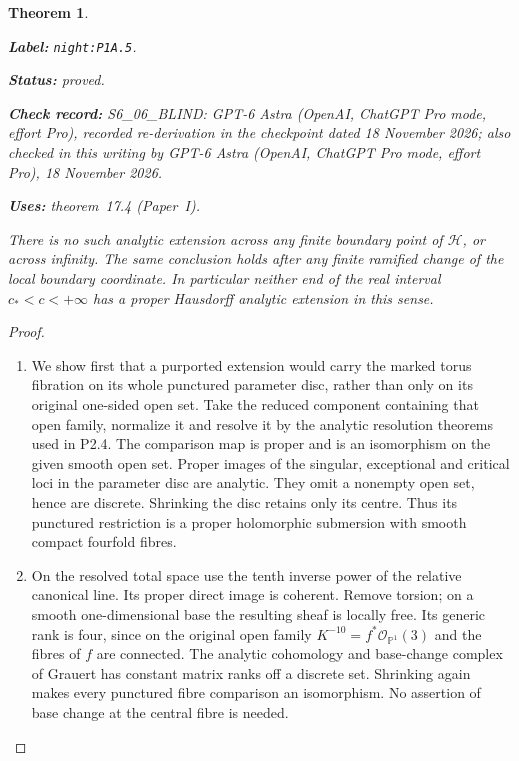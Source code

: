 \documentclass[11pt,a4paper]{article}
\newtheorem{theorem}{Theorem}[section]
\theoremstyle{definition}
\newcommand{\StatementRecord}[4]{\par\smallskip\begingroup\upshape\raggedright\noindent\textbf{Label:} \nolinkurl{#1}.\par\noindent\textbf{Status:} #2.\par\noindent\textbf{Check record:} #3.\par\noindent\textbf{Uses:} #4.\par\endgroup\smallskip}
\newcommand{\CurrentChecker}{GPT-6 Astra (OpenAI, ChatGPT Pro mode, effort Pro), 18 November 2026}
\newcommand{\ExternalPaperRef}[3]{\ifmmode\text{\upshape #1#2 (Paper~#3)}\else #1#2 (Paper~#3)\fi}
\begin{document}
\begin{theorem}\label{night:P1A.5}
\StatementRecord{night:P1A.5}{proved}{S6\_06\_BLIND: GPT-6 Astra (OpenAI, ChatGPT Pro mode, effort Pro), recorded re-derivation in the checkpoint dated 18 November 2026; also checked in this writing by \CurrentChecker}{\ExternalPaperRef{theorem~}{17.4}{I}}
There is no such analytic extension across any finite boundary
point of $\mathcal H$, or across infinity. The same conclusion
holds after any finite ramified change of the local boundary
coordinate. In particular neither end of the real interval
$c_*<c<+\infty$ has a proper Hausdorff analytic extension in
this sense.
\end{theorem}
\begin{proof}
\begin{enumerate}[label=\arabic*.]
\item We show first that a purported extension would carry the marked
torus fibration on its whole punctured parameter disc, rather
than only on its original one-sided open set.
Take the reduced component containing that open family,
normalize it and resolve it by the analytic resolution theorems
used in P2.4. The comparison map is proper and is an isomorphism
on the given smooth open set. Proper images of the singular,
exceptional and critical loci in the parameter disc are analytic.
They omit a nonempty open set, hence are discrete. Shrinking
the disc retains only its centre. Thus its punctured restriction
is a proper holomorphic submersion with smooth compact
fourfold fibres.

\item On the resolved total space use the tenth inverse power of the
relative canonical line. Its proper direct image is coherent.
Remove torsion; on a smooth one-dimensional base the resulting
sheaf is locally free. Its generic rank is four, since on the
original open family $K^{-10}=f^*\mathcal O_{\mathbb P^1}(3)$
and the fibres of $f$ are connected. The analytic cohomology
and base-change complex of Grauert has constant matrix ranks
off a discrete set. Shrinking again makes every punctured
fibre comparison an isomorphism. No assertion of base change
at the central fibre is needed.


\end{enumerate}
\end{proof}
\end{document}
